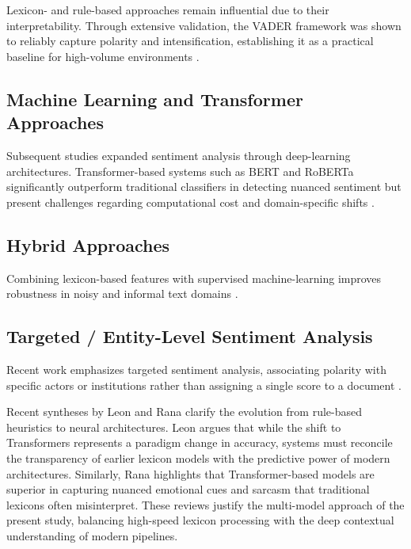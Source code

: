 Lexicon- and rule-based approaches remain influential due to their interpretability. Through extensive validation, the VADER framework was shown to reliably capture polarity and intensification, establishing it as a practical baseline for high-volume environments \cite{ref08}.

\subsection{Machine Learning and Transformer Approaches}
\label{machine-learning-and-transformer-approaches}

Subsequent studies expanded sentiment analysis through deep-learning architectures. Transformer-based systems such as BERT and RoBERTa significantly outperform traditional classifiers in detecting nuanced sentiment but present challenges regarding computational cost and domain-specific shifts \cite{ref10,ref14}.

\subsection{Hybrid Approaches}
\label{hybrid-approaches}

Combining lexicon-based features with supervised machine-learning improves robustness in noisy and informal text domains \cite{ref09}.

\subsection{Targeted / Entity-Level Sentiment Analysis}
\label{targeted-entity-level-sentiment-analysis}

Recent work emphasizes targeted sentiment analysis, associating polarity with specific actors or institutions rather than assigning a single score to a document \cite{ref12}.

Recent syntheses by Leon \cite{ref10} and Rana \cite{ref14} clarify the evolution from rule-based heuristics to neural architectures. Leon \cite{ref10} argues that while the shift to Transformers represents a paradigm change in accuracy, systems must reconcile the transparency of earlier lexicon models with the predictive power of modern architectures. Similarly, Rana \cite{ref14} highlights that Transformer-based models are superior in capturing nuanced emotional cues and sarcasm that traditional lexicons often misinterpret. These reviews justify the multi-model approach of the present study, balancing high-speed lexicon processing with the deep contextual understanding of modern pipelines.

